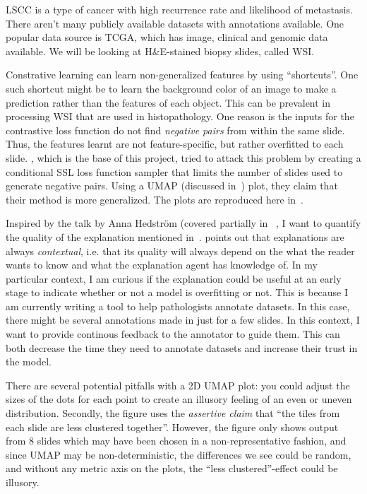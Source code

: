 \documentclass[10pt,twocolumn,letterpaper]{article}
\begin{document}
\gls{LSCC} is a type of cancer with high recurrence rate and likelihood of metastasis. There aren't many publicly available datasets with annotations available. One popular data source is \gls{TCGA}, which has image, clinical and genomic data available. We will be looking at H\&E-stained biopsy slides, called \gls{WSI}. 

Constrative learning can learn non-generalized features by using ``shortcuts''\cite{contrastiveShortcut}. One such shortcut might be to learn the background color of an image to make a prediction rather than the features of each object.  This can be prevalent in processing \gls{WSI} that are used in histopathology. One reason is the inputs for the contrastive loss function do not find \textit{negative pairs} from within the same slide. Thus, the features learnt are not feature-specific, but rather overfitted to each slide.
\cite{sslUMAP}, which is the base of this project, tried to attack this problem by creating a conditional \gls{SSL} loss function sampler that limits the number of slides used to generate negative pairs. Using a \gls{UMAP} (discussed in~) plot, they claim that their method is more generalized. The plots are reproduced here in~.

Inspired by the talk by Anna Hedstr\"{o}m (covered partially in ~, I want to quantify the quality of the explanation mentioned in~\cite{sslUMAP}. \cite{miller} points out that explanations are always \textit{contextual}, i.e. that its quality will always depend on the what the reader wants to know and what the explanation agent has knowledge of. In my particular context, I am curious if the explanation could be useful at an early stage to indicate whether or not a model is overfitting or not. This is because I am currently writing a tool to help pathologists annotate datasets. In this case, there might be several annotations made in just for a few slides. In this context, I want to provide continous feedback to the annotator to guide them. This can both decrease the time they need to annotate datasets and increase their trust in the model.

There are several potential pitfalls with a 2D \gls{UMAP} plot: you could adjust the sizes of the dots for each point to create an illusory feeling of an even or uneven distribution. Secondly, the figure uses the \textit{assertive claim} that ``the tiles from each slide are less clustered together''. However, the figure only shows output from 8 slides which may have been chosen in a non-representative fashion, and since \gls{UMAP} may be non-deterministic, the differences we see could be random, and without any metric axis on the plots, the ``less clustered''-effect could be illusory. 
\end{document}
